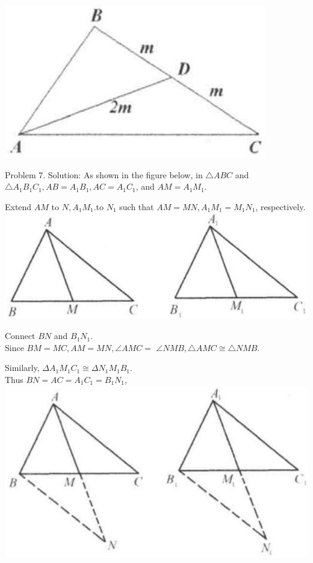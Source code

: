 \documentclass[10pt]{article}
\begin{document}
\begin{center}
\includegraphics[max width=\textwidth]{2025_04_17_97bc1f7e44d93c271a88g-031(2)}
\end{center}

Problem 7. Solution:
As shown in the figure below, in \(\triangle A B C\) and \(\triangle A_{1} B_{1} C_{1}, A B=A_{1} B_{1}, A C=A_{1} C_{1}\), and \(A M=A_{1} M_{1}\).

Extend \(A M\) to \(N, A_{1} M_{1}\).to \(N_{1}\) such that \(A M=M N, A_{1} M_{1}=M_{1} N_{1}\), respectively.\\
\includegraphics[max width=\textwidth, center]{2025_04_17_97bc1f7e44d93c271a88g-031}

Connect \(B N\) and \(B_{1} N_{1}\).\\
Since \(B M=M C, A M=M N, \angle A M C=\) \(\angle N M B, \triangle A M C \cong \triangle N M B\).

Similarly, \(\Delta A_{1} M_{1} C_{1} \cong \Delta N_{1} M_{1} B_{1}\).\\
Thus \(B N=A C=A_{1} C_{1}=B_{1} N_{1}\),\\
\includegraphics[max width=\textwidth, center]{2025_04_17_97bc1f7e44d93c271a88g-031(1)}
\end{document}

